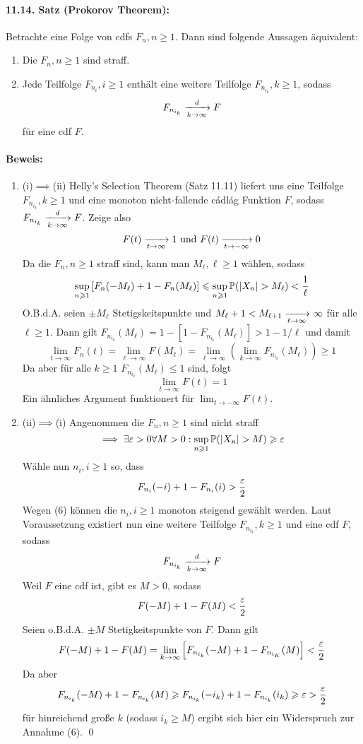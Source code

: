 \paragraph{11.14. Satz (Prokorov Theorem):} Betrachte eine Folge von cdfs $F_n,n\geq1$. Dann sind folgende Aussagen \"aquivalent:
\begin{enumerate}[label=(\roman*)]
    \item Die $F_n,n\geq1$ sind straff.
    \item Jede Teilfolge $F_{n_i},i\geq1$ enth\"alt eine weitere Teilfolge $F_{n_{i_k}},k\geq1$, sodass 
        $$F_{n_{i_k}}\nto{d}{k\to\infty}F$$
        f\"ur eine cdf $F$.
\end{enumerate}

\paragraph{Beweis:}
\begin{enumerate}[label=\Roman*.]
    \item (i)$\implies$(ii)\newline
    Helly's Selection Theorem (Satz 11.11) liefert uns eine Teilfolge $F_{n_{i_k}},k\geq1$ und eine monoton nicht-fallende cádlág Funktion $F$, sodass $F_{n_{i_k}}\nto{d}{k\to\infty}F$. Zeige also 
    $$F(t)\nto{}{t\to\infty}1\text{ und }F(t)\nto{}{t\to-\infty}0$$
    Da die $F_n,n\geq1$ straff sind, kann man $M_\ell,\ell\geq1$ w\"ahlen, sodass
    $$\sup_{n\geq1}\left[F_n(-M_\ell)+1-F_n(M_\ell)\right]\leq\sup_{n\geq1}\Pp(|X_n|>M_\ell)<\dfrac{1}{\ell}$$
    O.B.d.A. seien $\pm M_\ell$ Stetigskeitspunkte und $M_\ell+1<M_{\ell+1}\nto{}{\ell\to\infty}\infty$ f\"ur alle $\ell\geq1$. Dann gilt $F_{n_{i_k}}(M_\ell)=1-[1-F_{n_{i_k}}(M_\ell)]>1-1/\ell$
    und damit
    $$\lim_{t\to\infty}F_n(t)=\lim_{\ell\to\infty}F(M_\ell)=\lim_{\ell\to\infty}\left(\lim_{k\to\infty}F_{n_{i_k}}(M_\ell)\right)\geq1$$
    Da aber f\"ur alle $k\geq1$ $F_{n_{i_k}}(M_\ell)\leq1$ sind, folgt
    $$\lim_{t\to\infty}F(t)=1$$
    Ein \"ahnliches Argument funktionert f\"ur $\lim_{t\to-\infty}F(t)$.
    \item (ii)$\implies$(i)\newline
    Angenommen die $F_n,n\geq1$ sind nicht straff
    \begin{equation}
        \implies\exists\eps>0\forall M>0:\sup_{n\geq1}\Pp(|X_n|>M)\geq\eps
    \end{equation}
    W\"ahle nun $n_i,i\geq1$ so, dass
    $$F_{n_i}(-i)+1-F_{n_i}(i)>\dfrac{\varepsilon}{2}$$
    Wegen (6) k\"onnen die $n_i,i\geq1$ monoton steigend gew\"ahlt werden. Laut Voraussetzung existiert nun eine weitere Teilfolge $F_{n_{i_k}},k\geq1$ und eine cdf $F$, sodass
    $$F_{n_{i_k}}\nto{d}{k\to\infty}F$$
    Weil $F$ eine cdf ist, gibt es $M>0$, sodass
    $$F(-M)+1-F(M)<\dfrac{\varepsilon}{2}$$
    Seien o.B.d.A. $\pm M$ Stetigkeitspunkte von $F$. Dann gilt
    $$F(-M)+1-F(M)=\lim_{k\to\infty}\left[F_{n_{i_k}}(-M)+1-F_{n_{i_K}}(M)\right]<\dfrac{\varepsilon}{2}$$
    Da aber 
    $$F_{n_{i_k}}(-M)+1-F_{n_{i_k}}(M)\geqslant F_{n_{i_k}}(-i_k)+1-F_{n_{i_k}}(i_k)\geqslant\varepsilon>\dfrac{\varepsilon}{2}$$
    f\"ur hinreichend gro\ss{}e $k$ (sodass $i_k\geq M$) ergibt sich hier ein Widerspruch zur Annahme (6). \qed
\end{enumerate}

